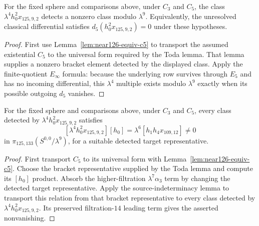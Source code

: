 \begin{corollary}
  \label{cor:h02x1259-d5-zero}
  \notready
  For the fixed sphere and comparisons above, under $C_3$ and $C_5$, the class
  $\lambda^4h_0^2x_{125,9,2}$ detects a nonzero class modulo $\lambda^9$.
  Equivalently, the unresolved classical differential satisfies
  $d_5(h_0^2x_{125,9,2})=0$ under these hypotheses.
\end{corollary}

\begin{proof}
  First use Lemma~\ref{lem:near126-equiv-c5} to transport the assumed
  existential $C_5$ to the universal form required by the Toda lemma.  That
  lemma supplies a nonzero bracket element detected by the displayed
  class.  Apply the finite-quotient $E_\infty$ formula: because the underlying
  row survives through $E_5$ and has no incoming differential, this
  $\lambda^4$ multiple exists modulo $\lambda^9$ exactly when its possible
  outgoing $d_5$ vanishes.
\end{proof}

\begin{corollary}
  \label{cor:near126-two-extension}
  \notready
  For the fixed sphere and comparisons above, under $C_3$ and $C_5$, every class
  detected by
  $\lambda^4h_0^2x_{125,9,2}$ satisfies
  \[
    [\lambda^4h_0^2x_{125,9,2}][h_0]
      =\lambda^6[h_1h_4x_{109,12}]\ne0
  \]
  in $\pi_{125,133}(S^{0,0}/\lambda^9)$, for a suitable detected target
  representative.
\end{corollary}

\begin{proof}
  First transport $C_5$ to its universal form with
  Lemma~\ref{lem:near126-equiv-c5}.  Choose the bracket representative supplied
  by the Toda lemma and compute its
  $[h_0]$ product.  Absorb the higher-filtration $\lambda^7\alpha_3$ term by
  changing the detected target representative.  Apply the source-indeterminacy
  lemma to transport this relation from that bracket representative to every
  class detected by $\lambda^4h_0^2x_{125,9,2}$.  Its preserved
  filtration-$14$ leading term gives the asserted nonvanishing.
\end{proof}

